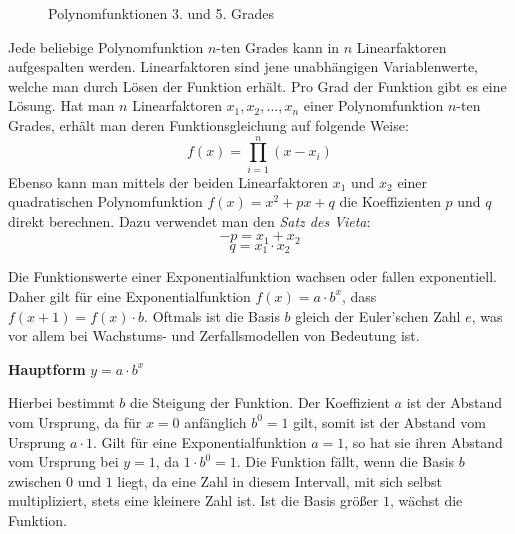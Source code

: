 \pagebreak

\begin{figure}[t!]
\centering
\caption*{Polynomfunktionen 3. und 5. Grades}
\end{figure}


Jede beliebige Polynomfunktion $n$-ten Grades kann in $n$ Linearfaktoren aufgespalten werden. Linearfaktoren sind jene unabh\"{a}ngigen Variablenwerte, welche man durch L\"{o}sen der Funktion erh\"{a}lt. Pro Grad der Funktion gibt es eine L\"{o}sung. Hat man $n$ Linearfaktoren $x_{1}, x_{2}, ..., x_{n}$ einer Polynomfunktion $n$-ten Grades, erh\"{a}lt man deren Funktionsgleichung auf folgende Weise: $$f(x) = \prod_{i = 1}^{n} (x - x_{i})$$ Ebenso kann man mittels der beiden Linearfaktoren $x_{1}$ und $x_{2}$ einer quadratischen Polynomfunktion $f(x) = x^2 + px + q$ die Koeffizienten $p$ und $q$ direkt berechnen. Dazu verwendet man den \emph{Satz des Vieta}: $$-p = x_{1} + x_{2}$$ $$q = x_{1} \cdot x_{2}$$


Die Funktionswerte einer Exponentialfunktion wachsen oder fallen exponentiell. Daher gilt f\"{u}r eine Exponentialfunktion $f(x) = a \cdot b^x$, dass $f(x + 1) = f(x) \cdot b$. Oftmals ist die Basis $b$ gleich der Euler'schen Zahl $e$, was vor allem bei Wachstums- und Zerfallsmodellen von Bedeutung ist.

\textbf{Hauptform}  $y = a \cdot b^x$

Hierbei bestimmt $b$ die Steigung der Funktion. Der Koeffizient $a$ ist der Abstand vom Ursprung, da f\"{u}r $x = 0$ anf\"{a}nglich $b^0 = 1$ gilt, somit ist der Abstand vom Ursprung $a \cdot 1$. Gilt f\"{u}r eine Exponentialfunktion $a = 1$, so hat sie ihren Abstand vom Ursprung bei $y =1$, da $1 \cdot b^0 = 1$. Die Funktion f\"{a}llt, wenn die Basis $b$ zwischen $0$ und $1$ liegt, da eine Zahl in diesem Intervall, mit sich selbst multipliziert, stets eine kleinere Zahl ist. Ist die Basis gr\"{o}\ss{}er $1$, w\"{a}chst die Funktion.

